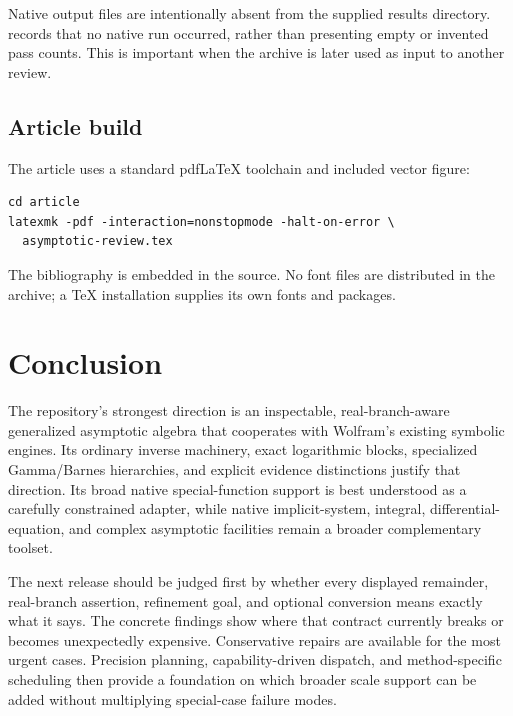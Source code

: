 \documentclass[11pt,letterpaper]{article}
\newcommand{\code}[1]{\texttt{\small\detokenize{#1}}}
\begin{document}
Native output files are intentionally absent from the supplied results directory. \code{native_status.json} records that no native run occurred, rather than presenting empty or invented pass counts. This is important when the archive is later used as input to another review.

\subsection{Article build}
The article uses a standard pdfLaTeX toolchain and included vector figure:
\begin{lstlisting}
cd article
latexmk -pdf -interaction=nonstopmode -halt-on-error \
  asymptotic-review.tex
\end{lstlisting}
The bibliography is embedded in the \code{.tex} source. No font files are distributed in the archive; a TeX installation supplies its own fonts and packages.

\section{Conclusion}
The repository's strongest direction is an inspectable, real-branch-aware generalized asymptotic algebra that cooperates with Wolfram's existing symbolic engines. Its ordinary inverse machinery, exact logarithmic blocks, specialized Gamma/Barnes hierarchies, and explicit evidence distinctions justify that direction. Its broad native special-function support is best understood as a carefully constrained adapter, while native implicit-system, integral, differential-equation, and complex asymptotic facilities remain a broader complementary toolset.\cite{repo-core,repo-guide,repo-native,wl-asymptoticsolve,wl-integrate,wl-dsolve}

The next release should be judged first by whether every displayed remainder, real-branch assertion, refinement goal, and optional conversion means exactly what it says. The concrete findings show where that contract currently breaks or becomes unexpectedly expensive. Conservative repairs are available for the most urgent cases. Precision planning, capability-driven dispatch, and method-specific scheduling then provide a foundation on which broader scale support can be added without multiplying special-case failure modes.

\appendix
\end{document}
